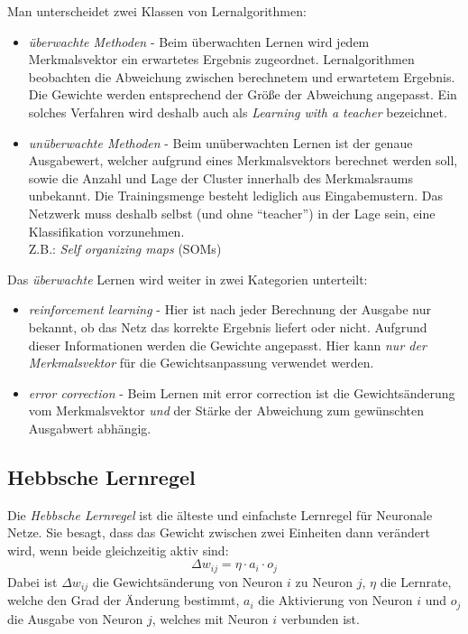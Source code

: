 Man unterscheidet zwei Klassen von Lernalgorithmen:
\begin{itemize}
	\item \emph{überwachte Methoden} - Beim überwachten Lernen wird jedem Merkmalsvektor ein erwartetes Ergebnis zugeordnet. Lernalgorithmen beobachten die Abweichung zwischen berechnetem und erwartetem Ergebnis. Die Gewichte werden entsprechend der Größe der Abweichung angepasst. Ein solches Verfahren wird deshalb auch als \emph{Learning with a teacher} bezeichnet.
	\item \emph{unüberwachte Methoden} - Beim unüberwachten Lernen ist der genaue Ausgabewert, welcher aufgrund eines Merkmalsvektors berechnet werden soll, sowie die Anzahl und Lage der Cluster innerhalb des Merkmalsraums unbekannt. Die Trainingsmenge besteht lediglich aus Eingabemustern. Das Netzwerk muss deshalb selbst (und ohne "`teacher"') in der Lage sein, eine Klassifikation vorzunehmen. \\
	Z.B.: \emph{Self organizing maps} (SOMs)
\end{itemize}

Das \emph{überwachte} Lernen wird weiter in zwei Kategorien unterteilt:
\begin{itemize}
	\item \emph{reinforcement learning} - Hier ist nach jeder Berechnung der Ausgabe nur bekannt, ob das Netz das korrekte Ergebnis liefert oder nicht. Aufgrund dieser Informationen werden die Gewichte angepasst. Hier kann \emph{nur der Merkmalsvektor} für die Gewichtsanpassung verwendet werden.
	\item \emph{error correction} - Beim Lernen mit error correction ist die Gewichtsänderung vom Merkmalsvektor \emph{und} der Stärke der Abweichung zum gewünschten Ausgabwert abhängig.
\end{itemize}

\subsection*{Hebbsche Lernregel}
Die \emph{Hebbsche Lernregel} ist die älteste und einfachste Lernregel für Neuronale Netze. Sie besagt, dass das Gewicht zwischen zwei Einheiten dann verändert wird, wenn beide gleichzeitig aktiv sind:
\[
	\Delta w_{ij} = \eta \cdot a_i \cdot o_j
\]
Dabei ist $\Delta w_{ij}$ die Gewichtsänderung von Neuron $i$ zu Neuron $j$, $\eta$ die Lernrate, welche den Grad der Änderung bestimmt, $a_i$ die Aktivierung von Neuron $i$ und $o_j$ die Ausgabe von Neuron $j$, welches mit Neuron $i$ verbunden ist.

